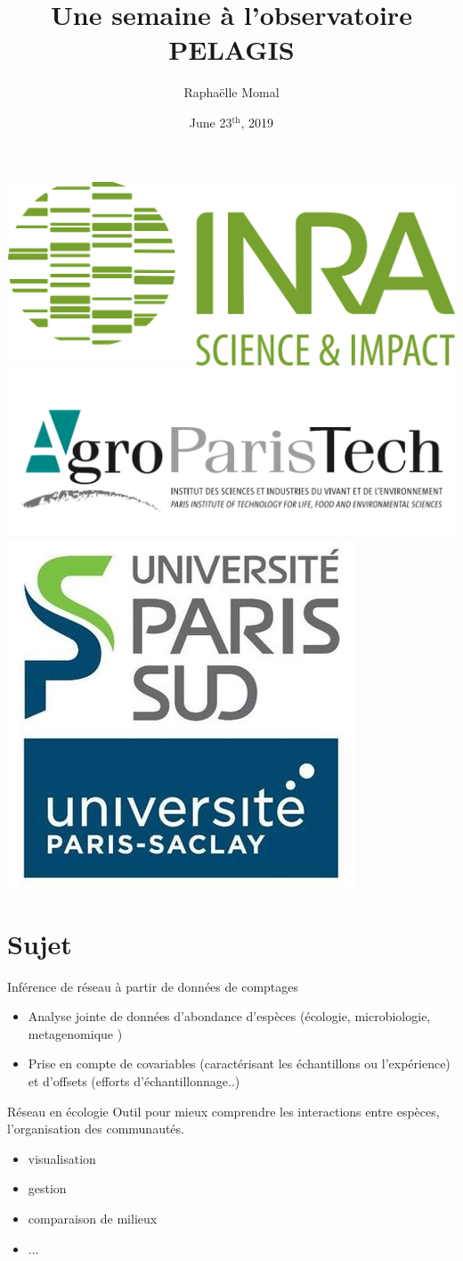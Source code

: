 \documentclass[11pt]{beamer}
\title{Une semaine à l'observatoire PELAGIS}
\author{Raphaëlle Momal}
\date{June 23$^{\text{th}}$, 2019}
\begin{document}
\begin{frame}
    \titlepage
    \begin{center}
    \includegraphics[width=0.2\linewidth]{logo_inra.jpg}\hspace{1cm}
	\includegraphics[width=0.2\linewidth]{agro.PNG}\hspace{0.8cm}
	\includegraphics[width=0.1\linewidth]{upsud.jpg}    
    \end{center}

\end{frame}


\section{Sujet}
\begin{frame}{Inférence de réseau à partir de données de comptages}

\begin{itemize}
	\item Analyse jointe de données d'abondance d'espèces (écologie, microbiologie, metagenomique )
	\item Prise en compte de covariables (caractérisant les échantillons ou l'expérience) et d'offsets (efforts d'échantillonnage..)
\end{itemize}
\vspace{0.5cm}
\begin{block}{Réseau en écologie}
Outil pour mieux comprendre les interactions entre espèces, l'organisation des communautés.
\begin{itemize}
\item visualisation
\item gestion
\item comparaison de milieux
\item ...
\end{itemize}
\end{block}\bigskip
\end{frame}
\end{document}
